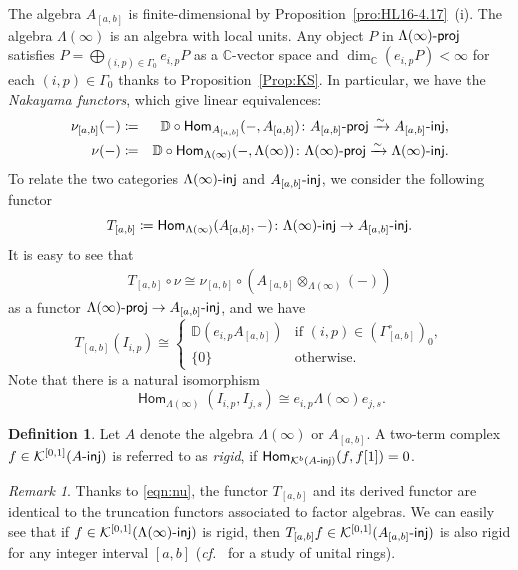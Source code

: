 \documentclass[12pt]{amsart}
\theoremstyle{definition}
\newtheorem{definition}[theorem]{Definition}
\theoremstyle{remark}
\newtheorem{remark}[theorem]{Remark}
\numberwithin{equation}{section}
\newcommand{\opname}[1]{\operatorname{\mathsf{#1}}}
\newcommand{\Hom}{\opname{Hom}}
\newcommand{\confer}{\textit{cf.}\ }
\newcommand{\injc}{\mathchar`-\mathsf{inj}}
\newcommand{\projc}{\mathchar`-\mathsf{proj}}
\begin{document}
The algebra $A_{[a,b]}$ is finite-dimensional by Proposition~\ref{pro:HL16-4.17}~(i). The algebra $\Lambda(\infty)$ is an algebra with local units. Any object $P$ in $\Lambda(\infty)\projc$ satisfies $P=\bigoplus_{(i,p)\in \Gamma_0} e_{i,p}P$ as a $\mathbb{C}$-vector space and $\dim_{\mathbb{C}}(e_{i,p}P) <\infty$ for each $(i,p)\in \Gamma_0$ thanks to Proposition~\ref{Prop:KS}. In particular, we have the \emph{Nakayama functors}, which give linear equivalences:
   \begin{eqnarray*}
      \nu_{[a,b]}(-)&\coloneqq& \mathbb{D}\circ\Hom_{A_{[a,b]}}(-, A_{[a,b]})\colon A_{[a,b]}\projc \xrightarrow{\sim} A_{[a,b]}\injc,\\ 
      \nu(-)&\coloneqq& \mathbb{D}\circ\Hom_{\Lambda(\infty)}(-, \Lambda(\infty))\colon \Lambda(\infty)\projc \xrightarrow{\sim} \Lambda(\infty)\injc.
   \end{eqnarray*}
To relate the two categories $\Lambda(\infty)\injc$ and $A_{[a,b]}\injc$, we consider the following functor
\[T_{[a,b]}\coloneq \Hom_{\Lambda(\infty)}(A_{[a,b]}, -) \colon \Lambda(\infty)\injc \to A_{[a,b]}\injc.\]
It is easy to see that 
\begin{eqnarray}\label{eqn:nu}
T_{[a,b]}\circ \nu \cong \nu_{[a,b]}\circ (A_{[a,b]}\otimes_{\Lambda(\infty)}(-))
\end{eqnarray}
as a functor  $\Lambda(\infty)\projc\to A_{[a,b]}\injc$, and we have \[T_{[a,b]}(I_{i,p}) \cong \begin{cases}
\mathbb{D}(e_{i,p}A_{[a,b]}) & \text{if $(i,p) \in (\Gamma_{[a,b]}^\circ)_0$}, \\
\{ 0 \} & \text{otherwise.}
\end{cases}\]
Note that there is a natural isomorphism
\begin{equation}\label{eq:HomII}
\Hom_{\Lambda(\infty)}(I_{i,p}, I_{j,s}) \cong e_{i,p} \Lambda(\infty) e_{j,s}.
\end{equation}
\begin{definition}
    Let $A$ denote the algebra $\Lambda(\infty)$ or $A_{[a,b]}$.
    A two-term complex $f\in \mathcal{K}^{[0,1]}(A\injc)$ is referred to as {\em rigid}, if  $\Hom_{\mathcal{K}^{b}(A\injc)}(f,f[1])=0$.
\end{definition}
\begin{remark}\label{rem:T_X2}
    Thanks to \eqref{eqn:nu}, the functor $T_{[a,b]}$ and its derived functor are identical to the truncation functors associated to factor algebras. We can easily see that if $f\in \mathcal{K}^{[0,1]}(\Lambda(\infty)\injc)$ is rigid, then $T_{[a,b]}f \in \mathcal{K}^{[0,1]}(A_{[a,b]}\injc)$ is also rigid for any integer interval $[a,b]$ (\confer \cite[Lemma~2.13]{KI22} for a study of unital rings).
\end{remark}
\end{document}
